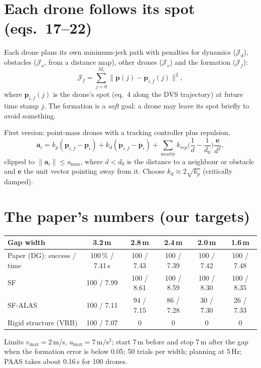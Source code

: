 \documentclass[11pt,a4paper]{article}
\newcommand{\vect}[1]{\mathbf{#1}}
\begin{document}
\section{Each drone follows its spot (eqs.~17--22)}\label{sec:agent}

Each drone plans its own minimum-jerk path with penalties for dynamics ($\mathcal{J}_d$), obstacles ($\mathcal{J}_o$,
from a distance map), other drones ($\mathcal{J}_s$) and the formation ($\mathcal{J}_f$):
\begin{equation}
\mathcal{J}_f=\sum_{j=0}^{M_c}\|\vect{p}(j)-\vect{p}_{i,f}(j)\|^2 ,\tag{22}
\end{equation}
where $\vect{p}_{i,f}(j)$ is the drone's spot (eq.~4 along the DVS trajectory) at future time stamp $j$. The formation
is a \emph{soft} goal: a drone may leave its spot briefly to avoid something.

\begin{oursbox}
First version: point-mass drones with a tracking controller plus repulsion,
\[
\vect{a}_i=k_p(\vect{p}_{i,f}-\vect{p}_i)+k_d(\dot{\vect{p}}_{i,f}-\dot{\vect{p}}_i)+\sum_{\text{nearby}}
k_{rep}\Big(\frac1d-\frac1{d_0}\Big)\frac{\vect{e}}{d^2},
\]
clipped to $\|\vect{a}_i\|\le a_{\max}$, where $d<d_0$ is the distance to a neighbour or obstacle and $\vect{e}$ the
unit vector pointing away from it. Choose $k_d\approx2\sqrt{k_p}$ (critically damped).
\end{oursbox}

\section{The paper's numbers (our targets)}
\begin{center}\small
\begin{tabular}{@{}lccccc@{}}
\toprule
Gap width & 3.2\,m & 2.8\,m & 2.4\,m & 2.0\,m & 1.6\,m\\
\midrule
Paper (DG): success / time & 100\,\% / 7.41\,s & 100 / 7.43 & 100 / 7.39 & 100 / 7.42 & 100 / 7.48\\
SF & 100 / 7.99 & 100 / 8.61 & 100 / 8.59 & 100 / 8.30 & 100 / 8.35\\
SF-ALAS & 100 / 7.11 & 94 / 7.15 & 86 / 7.28 & 30 / 7.30 & 26 / 7.33\\
Rigid structure (VRB) & 100 / 7.07 & 0 & 0 & 0 & 0\\
\bottomrule
\end{tabular}
\end{center}
Limits $v_{\max}=2$\,m/s, $a_{\max}=7\,\mathrm{m/s^2}$; start 7\,m before and stop 7\,m after the gap when the formation
error is below 0.05; 50 trials per width; planning at 5\,Hz; PAAS takes about 0.16\,s for 100 drones.
\end{document}
